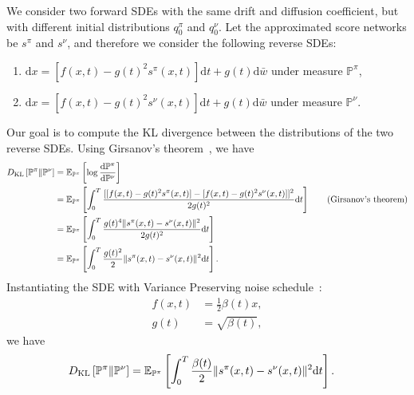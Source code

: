 We consider two forward SDEs with the same drift and diffusion coefficient, but with different initial distributions $q_0^\pi$ and $q_0^\nu$. Let the approximated score networks be $s^\pi$ and $s^\nu$, and therefore we consider the following reverse SDEs:
\begin{enumerate}
\item $\mathrm d x = \left[f(x,t)-g(t)^2 s^\pi(x, t)\right]\mathrm dt + g(t)\mathrm d \bar{w}$ under measure $\mathbb{P}^\pi$, 
\item $\mathrm d x = \left[f(x,t)-g(t)^2 s^\nu(x, t)\right]\mathrm dt + g(t)\mathrm d \bar{w}$ under measure $\mathbb{P}^\nu$.
\end{enumerate}
Our goal is to compute the KL divergence between the distributions of the two reverse SDEs. Using Girsanov's theorem~\citep{oksendal2013stochastic}, we have
\begin{equation}\label{appeq:sde_kl}
    \begin{aligned}
        D_{\rm KL}\left[\mathbb{P^\pi}\|\mathbb{P}^\nu\right]&=\mathbb{E}_{\mathbb{P}^\pi}\left[\log \frac{\mathrm{d}\mathbb{P}^\pi}{\mathrm{d}\mathbb{P}^\nu}\right]\\
        &=\mathbb{E}_{\mathbb{P}^\pi}\left[\int_{0}^T\frac{[[f(x,t)-g(t)^2s^\pi(x, t)]-[f(x, t)-g(t)^2s^\nu(x, t)]]^2}{2g(t)^2}\mathrm{d}t\right]\quad\quad\text{(Girsanov's theorem)}\\
        &=\mathbb{E}_{\mathbb{P}^\pi}\left[\int_{0}^T\frac{g(t)^4\|s^\pi(x, t)-s^\nu(x, t)\|^2}{2g(t)^2}\mathrm{d}t\right]\\
        &=\mathbb{E}_{\mathbb{P}^\pi}\left[\int_{0}^T\frac{g(t)^2}2\|s^\pi(x, t)-s^\nu(x, t)\|^2\mathrm{d}t\right]. 
    \end{aligned}
\end{equation} 
Instantiating the SDE with Variance Preserving noise schedule~\citep{diffusion_sde}:
\begin{equation}
    \begin{aligned}
        f(x, t) &= \frac 12 \beta(t)x,\\
        g(t) &= \sqrt{\beta(t)},
    \end{aligned}
\end{equation}
we have
\begin{equation}
    \begin{aligned}
        D_{\rm KL}\left[\mathbb{P}^\pi\|\mathbb{P}^\nu\right]&=\mathbb{E}_{\mathbb{P}^\pi}\left[\int_0^T\frac{\beta(t)}{2}\|s^\pi(x, t)-s^\nu(x, t)\|^2\mathrm{d}t\right].
    \end{aligned}
\end{equation}


